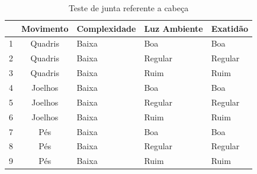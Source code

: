   \begin{table}[H]
  \centering
  \caption{Teste de junta referente a cabeça}
  \label{tab:perna}
  \begin{tabular}{@{}|c|c|l|l|l|@{}}
  \toprule
  \multicolumn{1}{|l|}{ } & \multicolumn{1}{l|}{\textbf{Movimento}} & \textbf{Complexidade} & \textbf{Luz Ambiente} & \textbf{Exatidão} \\ \midrule
  1                                 & Quadris                     & Baixa                 & Boa                   & Boa               \\ \midrule
  2                                 & Quadris                     & Baixa                 & Regular               & Regular           \\ \midrule
  3                                 & Quadris                     & Baixa                 & Ruim                  & Ruim              \\ \bottomrule
  4                                 & Joelhos                     & Baixa                 & Boa                   & Boa               \\ \midrule
  5                                 & Joelhos                     & Baixa                 & Regular               & Regular           \\ \midrule
  6                                 & Joelhos                     & Baixa                 & Ruim                  & Ruim              \\ \bottomrule
  7                                 & Pés                         & Baixa                 & Boa                   & Boa               \\ \midrule
  8                                 & Pés                         & Baixa                 & Regular               & Regular           \\ \midrule
  9                                 & Pés                         & Baixa                 & Ruim                  & Ruim              \\ \bottomrule
  \end{tabular}
  \end{table}

